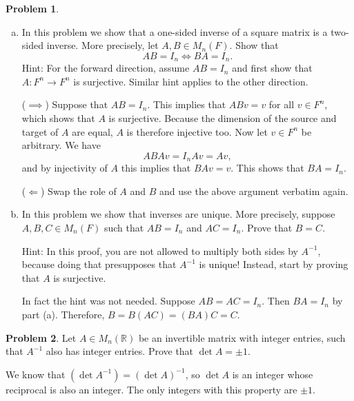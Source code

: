 \documentclass[11pt,oneside]{amsart}
\theoremstyle{definition}
\newtheorem{problem}{Problem}
\newcommand{\bR}{\mathbb{R}}
\begin{document}
    \begin{problem}
        \leavevmode\begin{enumerate}[(a)]
            \item In this problem we show that a one-sided inverse of a square matrix is a two-sided inverse. More precisely, let $A,B\in M_n(F)$. Show that
            \[AB=I_n\iff BA=I_n.\]
            Hint: For the forward direction, assume $AB=I_n$ and first show that $A\colon F^n\to F^n$ is surjective. Similar hint applies to the other direction.
            \begin{solution}
                ($\implies$) Suppose that $AB=I_n$. This implies that $ABv=v$ for all $v\in F^n$, which shows that $A$ is surjective. Because the dimension of the source and target of $A$ are equal, $A$ is therefore injective too. Now let $v\in F^n$ be arbitrary. We have
                \[ABAv=I_nAv=Av,\]
                and by injectivity of $A$ this implies that $BAv=v$. This shows that $BA=I_n$.

                ($\Leftarrow$) Swap the role of $A$ and $B$ and use the above argument verbatim again.
            \end{solution}

            \item In this problem we show that inverses are unique. More precisely, suppose $A,B,C\in M_n(F)$ such that $AB=I_n$ and $AC=I_n$. Prove that $B=C$.
            
            Hint: In this proof, you are not allowed to multiply both sides by $A^{-1}$, because doing that presupposes that $A^{-1}$ is unique! Instead, start by proving that $A$ is surjective.
            \begin{solution}
                In fact the hint was not needed. Suppose $AB=AC=I_n$. Then $BA=I_n$ by part (a). Therefore, $B=B(AC)=(BA)C=C$.
            \end{solution}
        \end{enumerate}
    \end{problem}

    \begin{problem}
        Let $A\in M_n(\bR)$ be an invertible matrix with integer entries, such that $A^{-1}$ also has integer entries. Prove that $\det A=\pm 1$.
    \end{problem}
    \begin{solution}
        We know that $(\det A^{-1})=(\det A)^{-1}$, so $\det A$ is an integer whose reciprocal is also an integer. The only integers with this property are $\pm 1$.
    \end{solution}
\end{document}
